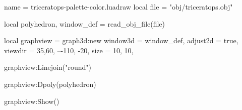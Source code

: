 \begin{luadraw}{name = triceratops-palette-color.luadraw}
local file = "obj/triceratops.obj"

local polyhedron, window_def = read_obj_file(file)

local graphview = graph3d:new{
  window3d = window_def,
  adjust2d = true,
  viewdir  = {35,60}, --{-110, -20},
  size     = {10, 10},
}

graphview:Linejoin("round")

graphview:Dpoly(polyhedron)

graphview:Show()
\end{luadraw}
